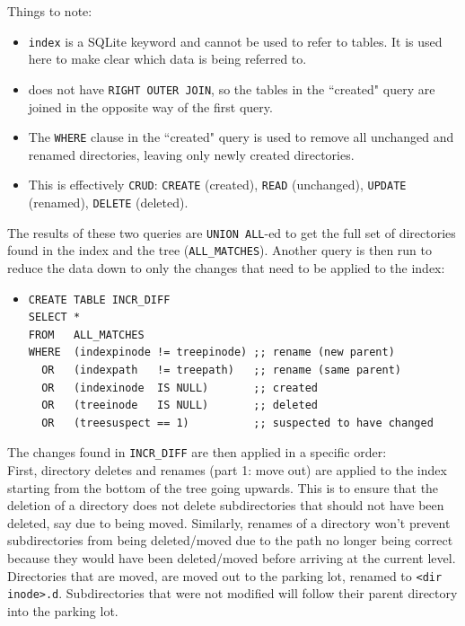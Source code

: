 \begin{enumerate}
  Things to note:

  \begin{itemize}
    \item \texttt{index} is a SQLite keyword and cannot be used to
      refer to tables. It is used here to make clear which data is
      being referred to.
      \item \sqlite does not have \texttt{RIGHT OUTER JOIN}, so the
        tables in the ``created" query are joined in the opposite way
        of the first query.
      \item The \texttt{WHERE} clause in the ``created" query is used
        to remove all unchanged and renamed directories, leaving only
        newly created directories.
      \item This is effectively \texttt{CRUD}: \texttt{CREATE}
        (created), \texttt{READ} (unchanged), \texttt{UPDATE}
        (renamed), \texttt{DELETE} (deleted).
  \end{itemize}

  The results of these two queries are \texttt{UNION ALL}-ed to get
  the full set of directories found in the index and the tree
  (\texttt{ALL\_MATCHES}). Another query is then run to reduce the data
  down to only the changes that need to be applied to the index:

  \begin{itemize} %
    \item[] \begin{verbatim}
CREATE TABLE INCR_DIFF
SELECT *
FROM   ALL_MATCHES
WHERE  (indexpinode != treepinode) ;; rename (new parent)
  OR   (indexpath   != treepath)   ;; rename (same parent)
  OR   (indexinode  IS NULL)       ;; created
  OR   (treeinode   IS NULL)       ;; deleted
  OR   (treesuspect == 1)          ;; suspected to have changed
    \end{verbatim}
  \end{itemize}
\end{enumerate}

The changes found in \texttt{INCR\_DIFF} are then applied in a
specific order: \\

First, directory deletes and renames (part 1: move out) are applied to
the index starting from the bottom of the tree going upwards. This is
to ensure that the deletion of a directory does not delete
subdirectories that should not have been deleted, say due to being
moved. Similarly, renames of a directory won't prevent subdirectories
from being deleted/moved due to the path no longer being correct
because they would have been deleted/moved before arriving at the
current level. Directories that are moved, are moved out to the
parking lot, renamed to \texttt{<dir inode>.d}. Subdirectories that
were not modified will follow their parent directory into the parking
lot. \\

